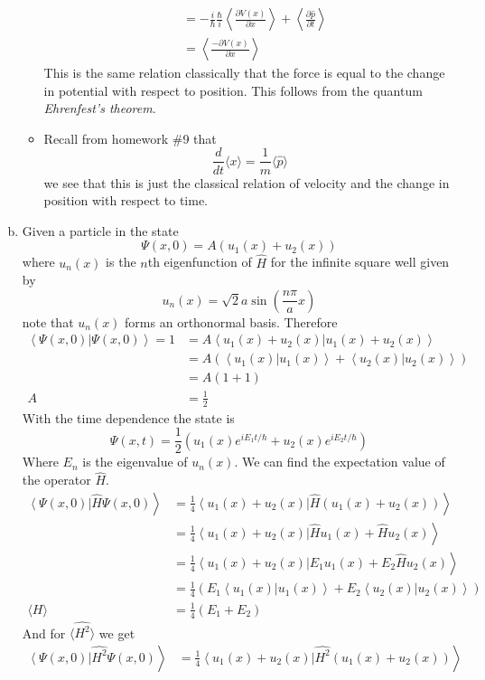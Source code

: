 \documentclass[11pt]{article}
\numberwithin{equation}{section}
\newcommand{\expt}[1]{\langle{#1}\rangle}
\newcommand{\norm}[2]{\left\langle{#1}\right|\left.{#2}\right\rangle}
\begin{document}
\begin{enumerate}[(a)]
\begin{itemize}
\begin{align*}
&= -\frac{i}{\hbar}\frac{\hbar}{i}\left\langle\frac{\partial V(x)}{\partial x}\right\rangle+\left\langle\frac{\partial\hat{p}}{\partial t}\right\rangle\\
&= \left\langle\frac{-\partial V(x)}{\partial x}\right\rangle
\end{align*}
This is the same relation classically that the force is equal to the change in potential with respect to position. This follows from the quantum \emph{Ehrenfest's theorem}.
\item Recall from homework \#9 that
$$\frac{d}{dt}\expt{x} = \frac{1}{m}\expt{\hat{p}}$$
we see that this is just the classical relation of velocity and the change in position with respect to time.
\end{itemize}

\item
Given a particle in the state 
$$\Psi(x,0) = A(u_1(x)+u_2(x))$$
where $u_n(x)$ is the $n$th eigenfunction of $\hat{H}$ for the infinite square well given by
$$u_n(x) = \sqrt{2}{a}\sin\left(\frac{n\pi}{a}x\right)$$
note that $u_n(x)$ forms an orthonormal basis. Therefore
\begin{align*}
\norm{\Psi(x,0)}{\Psi(x,0)} = 1 &= A\norm{u_1(x)+u_2(x)}{u_1(x)+u_2(x)}\\
&= A\left(\norm{u_1(x)}{u_1(x)} + \norm{u_2(x)}{u_2(x)}\right)\\
&= A(1+1)\\
A &= \frac{1}{2}
\end{align*}
With the time dependence the state is
$$\Psi(x,t) = \frac{1}{2}\left(u_1(x)e^{iE_1t/\hbar}+u_2(x)e^{iE_2t/\hbar}\right)$$
Where $E_n$ is the eigenvalue of $u_n(x)$. We can find the expectation value of the operator $\hat{H}$.
\begin{align*}
\norm{\Psi(x,0)}{\hat{H}\Psi(x,0)} &= \frac{1}{4}\norm{u_1(x)+u_2(x)}{\hat{H}\left(u_1(x)+u_2(x)\right)} \\
&= \frac{1}{4}\norm{u_1(x)+u_2(x)}{\hat{H}u_1(x)+\hat{H}u_2(x)} \\
&= \frac{1}{4}\norm{u_1(x)+u_2(x)}{E_1u_1(x)+E_2\hat{H}u_2(x)} \\
&= \frac{1}{4}\left(E_1\norm{u_1(x)}{u_1(x)}+E_2\norm{u_2(x)}{u_2(x)}\right)\\
\expt{H} &= \frac{1}{4}\left(E_1+E_2\right)
\end{align*}
And for $\expt{\hat{H^2}}$ we get
\begin{align*}
\norm{\Psi(x,0)}{\hat{H^2}\Psi(x,0)} &= \frac{1}{4}\norm{u_1(x)+u_2(x)}{\hat{H^2}\left(u_1(x)+u_2(x)\right)} \\

\end{align*}
\end{enumerate}
\end{document}
